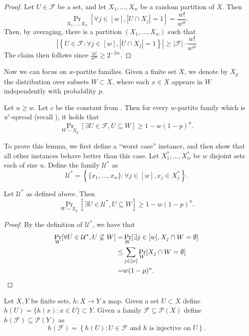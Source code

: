 \documentclass{toc}
\newcommand{\calF}{\mathcal{F}} %
\begin{document}
\begin{proof}
Let $U\in\calF$ be a set, and let $X_1,\dots,X_w$ be a random partition of
$X$. Then
$$
\Pr_{X_{1}, \ldots, X_{w}}\left[\forall j\in[w], |U\cap X_{j}|=1\right] = \frac{w!}{w^{w}}.
$$
Then, by %
averaging,  %
there is a partition $(X_1, \ldots,X_{w})$ such that
$$
\left|\left\{U\in\calF:\forall j\in[w], |U\cap X_{j}|= 1 \right\}\right| \geq |\calF|\cdot\frac{w!}{w^w}
$$
The claim then follows since $\frac{w!}{w^w} \geq 2^{-2 w}$.
\end{proof}

Now we can focus on %
$w$-partite families.  %
Given a finite set $X$, we denote by $X_p$ the distribution over subsets $W \subset X$,
where each $x \in X$ appears in $W$ independently with probability $p$.

\begin{lemma}
\label{lemma:existence}
Let $u \ge w$. Let $c$ be the constant from .
Then for every %
$w$-partite family  %
which is $u^c$-spread (recall ), it holds that
$$
\Pr_{W\sim X_p}[\exists U\in\calF, U\subseteq W]\geq 1-w (1-p)^{u}.
$$
\end{lemma}

To prove this lemma, we first define a ``worst case'' instance, and then show that all other instances behave better than this case.
Let $X_{1}^*, \ldots,X_{w}^*$ be $w$ disjoint sets each of size $u$. Define the family $\mathcal{U}^*$ as
$$
\mathcal{U}^* = \left\{\{x_{1}, \ldots,x_{w}\}:\forall j\in[w], x_{j}\in X^*_{j}\right\}.
$$
\begin{claim}
\label{claim:worstcase}
Let $\mathcal{U}^*$ as defined above. Then
$$
\Pr_{W\sim X_{p}}[\exists U\in\mathcal{U}^*, U\subseteq W]\geq 1-w (1-p)^{u}.
$$
\end{claim}

\begin{proof}
By the definition of $\mathcal{U}^*$, we have that
\begin{align*}
\Pr_{W}[\forall U\in\mathcal{U}^*, U\not\subseteq W]=& \Pr_{W}[\exists j\in[w], X_{j}\cap W =\emptyset] \\
\leq&\sum_{j\in[w]} \Pr_{W}[X_{j}\cap W =\emptyset]\\
=& w (1-p)^{u}.    \qedhere  %
\end{align*}
\end{proof}

Let $X,Y$ be finite sets, $h:X \to Y$ a map. Given a set $U \subset X$ define $h(U)=\{h(x): x \in U\} \subset Y$.
Given a family $\calF \subseteq \mathcal{P}(X)$ define $h(\calF) \subseteq \mathcal{P}(Y)$ as
$$
h(\calF) = \left\{h(U): U \in \calF \text{ and } h \text{ is injective on } U \right\}.
$$
\end{document}
